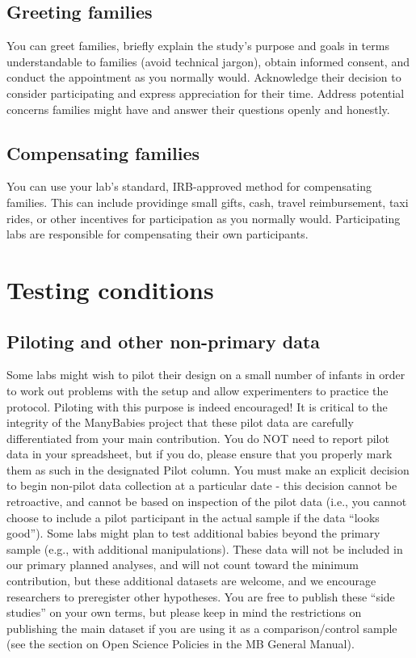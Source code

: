 \documentclass[
  letterpaper,
  DIV=11,
  numbers=noendperiod,
  oneside]{scrreprt}
\begin{document}
\section{Greeting families}\label{greeting-families}

You can greet families, briefly explain the study's purpose and goals in
terms understandable to families (avoid technical jargon), obtain
informed consent, and conduct the appointment as you normally would.
Acknowledge their decision to consider participating and express
appreciation for their time. Address potential concerns families might
have and answer their questions openly and honestly.

\section{Compensating families}\label{compensating-families}

You can use your lab's standard, IRB-approved method for compensating
families. This can include providinge small gifts, cash, travel
reimbursement, taxi rides, or other incentives for participation as you
normally would. Participating labs are responsible for compensating
their own participants.

\chapter{Testing conditions}\label{sec-test-conditions}

\section{Piloting and other non-primary
data}\label{piloting-and-other-non-primary-data}

Some labs might wish to pilot their design on a small number of infants
in order to work out problems with the setup and allow experimenters to
practice the protocol. Piloting with this purpose is indeed encouraged!
It is critical to the integrity of the ManyBabies project that these
pilot data are carefully differentiated from your main contribution. You
do NOT need to report pilot data in your spreadsheet, but if you do,
please ensure that you properly mark them as such in the designated
Pilot column. You must make an explicit decision to begin non-pilot data
collection at a particular date - this decision cannot be retroactive,
and cannot be based on inspection of the pilot data (i.e., you cannot
choose to include a pilot participant in the actual sample if the data
``looks good''). Some labs might plan to test additional babies beyond
the primary sample (e.g., with additional manipulations). These data
will not be included in our primary planned analyses, and will not count
toward the minimum contribution, but these additional datasets are
welcome, and we encourage researchers to preregister other hypotheses.
You are free to publish these ``side studies'' on your own terms, but
please keep in mind the restrictions on publishing the main dataset if
you are using it as a comparison/control sample (see the section on Open
Science Policies in the MB General Manual).
\end{document}
